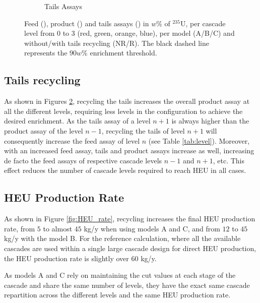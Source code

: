 \begin{figure}[h!]
\begin{subfigure}[t]{0.45\textwidth}
        \caption{Tails Assays}
        \label{sfig:tails_assay}
    \end{subfigure}
    \caption{Feed (), product
        () and tails assays ()
        in $w\%$ of $^{235}$U, per cascade level from 0 to 3 (red, green, orange,
        blue), per model (A/B/C) and without/with tails recycling (NR/R). The
        black dashed line represents the $90 w\%$ enrichment threshold.}
    \label{fig:assays}
\end{figure}



\subsection{Tails recycling}

As shown in Figures \ref{fig:assays}, recycling the tails increases the overall product assay at
all the different levels, requiring less levels in the configuration to achieve
the desired enrichment. As the tails assay of a level $n+1$ is always higher than
the product assay of the level $n-1$, recycling the tails of level $n+1$ will
consequently increase the feed assay of level $n$ (see Table \ref{tab:level}).
Moreover, with an increased feed assay, tails and product assays increase as
well, increasing de facto the feed assays of respective cascade levels $n-1$
and $n+1$, etc.  This effect reduces the number of cascade levels required to reach
\gls{HEU} in all cases.



\subsection{\gls{HEU} Production Rate}

As shown in Figure \ref{fig:HEU_rate}, recycling increases the final \gls{HEU}
production rate, from $5$ to almost $45$ kg/y when using models A and C, and from
$12$ to $45$ kg/y with the model B. For the reference calculation, where all the
available cascades are used within a single large cascade design for direct
\gls{HEU} production, the \gls{HEU} production rate is slightly over $60$ kg/y.


As models A and C rely on maintaining the cut values at each stage of the
cascade and share the same number of levels, they have the exact same cascade
repartition across the different levels and the same \gls{HEU} production rate.

